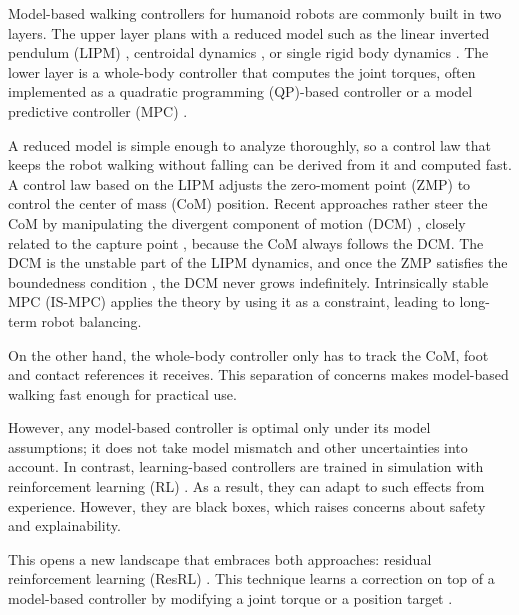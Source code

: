 \documentclass[conference]{IEEEtran}
\begin{document}
Model-based walking controllers for humanoid robots are commonly built in two layers.
The upper layer plans with a reduced model such as the linear inverted pendulum (LIPM) \cite{kajita2001lipm,kajita2003preview}, centroidal dynamics \cite{orin2013centroidal,dai2014centroidal}, or single rigid body dynamics \cite{dicarlo2018cheetah,winkler2018gait}.
The lower layer is a whole-body controller that computes the joint torques, often implemented as a quadratic programming (QP)-based controller \cite{saab2013dynamic,herzog2016momentum} or a model predictive controller (MPC) \cite{mastalli2020crocoddyl,dantec2022wbmpc}.

A reduced model is simple enough to analyze thoroughly, so a control law that keeps the robot walking without falling can be derived from it and computed fast.
A control law based on the LIPM adjusts the zero-moment point (ZMP) \cite{vukobratovic2004zmp} to control the center of mass (CoM) position. Recent approaches rather steer the CoM by manipulating the divergent component of motion (DCM) \cite{takenaka2009dcm,englsberger2011capture}, closely related to the capture point \cite{pratt2006capture,koolen2012capturability}, because the CoM always follows the DCM.
The DCM is the unstable part of the LIPM dynamics, and once the ZMP satisfies the boundedness condition \cite{lanari2014boundedness}, the DCM never grows indefinitely.
Intrinsically stable MPC (IS-MPC) \cite{scianca2020ismpc,dallard2025adios} applies the theory by using it as a constraint, leading to long-term robot balancing.

On the other hand, the whole-body controller only has to track the CoM, foot and contact references it receives.
This separation of concerns makes model-based walking fast enough for practical use.

However, any model-based controller is optimal only under its model assumptions; it does not take model mismatch and other uncertainties into account.
In contrast, learning-based controllers are trained in simulation with reinforcement learning (RL) \cite{hwangbo2019learning,lee2020learning,rudin2022minutes,radosavovic2024humanoid}. As a result, they can adapt to such effects from experience.
However, they are black boxes, which raises concerns about safety and explainability.

This opens a new landscape that embraces both approaches: residual reinforcement learning (ResRL) \cite{silver2018residual,johannink2019residual}. This technique learns a correction on top of a model-based controller by modifying a joint torque or a position target \cite{cheng2025rambo,jeon2025residualmpc}.
\end{document}
